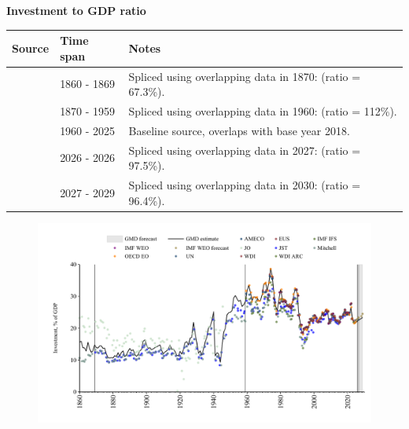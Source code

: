 \documentclass[12pt,a4paper,landscape]{article}
\begin{document}
\begin{adjustbox}{max totalsize={\paperwidth}{\paperheight},center}
\begin{minipage}[t][\textheight][t]{\textwidth}
\vspace*{0.5cm}
{}
\begin{center}
{\Large\bfseries Investment to GDP ratio}
\end{center}
\vspace{0.5cm}
\begin{table}[H]
\centering
\small
\begin{tabular}{|l|l|l|}
\hline
\textbf{Source} & \textbf{Time span} & \textbf{Notes} \\
\hline
\rowcolor{white}\cite{JO}& 1860 - 1869 &Spliced using overlapping data in 1870: (ratio = 67.3\%). \\
\rowcolor{lightgray}\cite{JST}& 1870 - 1959 &Spliced using overlapping data in 1960: (ratio = 112\%). \\
\rowcolor{white}\cite{OECD_EO}& 1960 - 2025 &Baseline source, overlaps with base year 2018. \\
\rowcolor{lightgray}\cite{AMECO}& 2026 - 2026 &Spliced using overlapping data in 2027: (ratio = 97.5\%). \\
\rowcolor{white}\cite{IMF_WEO_forecast}& 2027 - 2029 &Spliced using overlapping data in 2030: (ratio = 96.4\%). \\
\hline
\end{tabular}
\end{table}
\begin{figure}[H]
\centering
\includegraphics[width=\textwidth,height=0.6\textheight,keepaspectratio]{graphs/FIN_inv_GDP.pdf}
\end{figure}
\end{minipage}
\end{adjustbox}
\end{document}
